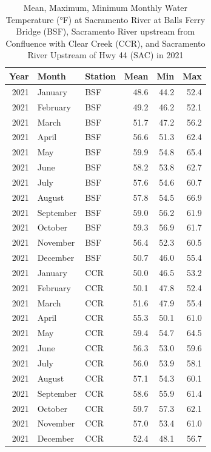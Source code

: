 \documentclass[
]{book}
\theoremstyle{definition}
\theoremstyle{definition}
\theoremstyle{definition}
\theoremstyle{definition}
\theoremstyle{remark}
\begin{document}
\begin{table}
\centering
\caption{Mean, Maximum, Minimum Monthly Water Temperature (°F) at Sacramento River at Balls Ferry Bridge (BSF), Sacramento River upstream from Confluence with Clear Creek (CCR), and Sacramento River Upstream of Hwy 44 (SAC) in 2021}
\centering
\begin{tabular}[t]{rllrrr}
\hline
Year & Month & Station & Mean & Min & Max\\
\hline
2021 & January & BSF & 48.6 & 44.2 & 52.4\\
\hline
2021 & February & BSF & 49.2 & 46.2 & 52.1\\
\hline
2021 & March & BSF & 51.7 & 47.2 & 56.2\\
\hline
2021 & April & BSF & 56.6 & 51.3 & 62.4\\
\hline
2021 & May & BSF & 59.9 & 54.8 & 65.4\\
\hline
2021 & June & BSF & 58.2 & 53.8 & 62.7\\
\hline
2021 & July & BSF & 57.6 & 54.6 & 60.7\\
\hline
2021 & August & BSF & 57.8 & 54.5 & 66.9\\
\hline
2021 & September & BSF & 59.0 & 56.2 & 61.9\\
\hline
2021 & October & BSF & 59.3 & 56.9 & 61.7\\
\hline
2021 & November & BSF & 56.4 & 52.3 & 60.5\\
\hline
2021 & December & BSF & 50.7 & 46.0 & 55.4\\
\hline
2021 & January & CCR & 50.0 & 46.5 & 53.2\\
\hline
2021 & February & CCR & 50.1 & 47.8 & 52.4\\
\hline
2021 & March & CCR & 51.6 & 47.9 & 55.4\\
\hline
2021 & April & CCR & 55.3 & 50.1 & 61.0\\
\hline
2021 & May & CCR & 59.4 & 54.7 & 64.5\\
\hline
2021 & June & CCR & 56.3 & 53.0 & 59.6\\
\hline
2021 & July & CCR & 56.0 & 53.9 & 58.1\\
\hline
2021 & August & CCR & 57.1 & 54.3 & 60.1\\
\hline
2021 & September & CCR & 58.6 & 55.9 & 61.4\\
\hline
2021 & October & CCR & 59.7 & 57.3 & 62.1\\
\hline
2021 & November & CCR & 57.0 & 53.4 & 61.0\\
\hline
2021 & December & CCR & 52.4 & 48.1 & 56.7\\

\end{tabular}
\end{table}
\end{document}
